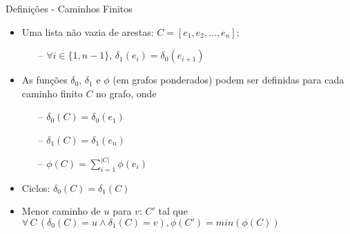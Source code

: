 \begin{frame}{Definições - Caminhos Finitos}
    \begin{itemize}
        \item Uma lista não vazia de arestas: $C = [e_1,e_2, ..., e_n]$;
        \begin{itemize}
            \item[--] $\forall i \in \{1, n-1\}$, $\delta_1(e_i) = \delta_0(e_{i+1})$
        \end{itemize}
        \item As funções $\delta_0$, $\delta_1$ e $\phi$ (em grafos ponderados) podem ser definidas para cada caminho finito $C$ no grafo, onde
        \begin{itemize}
            \item[--] $\delta_0(C) = \delta_0(e_1)$
            \item[--] $\delta_1(C) = \delta_1(e_n)$
            \item[--] $\phi(C) = \sum_{i=1}^{|C|} \phi(e_i)$
        \end{itemize}
        \item Ciclos: $\delta_0(C) = \delta_1(C)$
        \item Menor caminho de $u$ para $v$: $C'$ tal que $\forall\,C\,(\delta_0(C) = u \land \delta_1(C) = v), \phi(C') = min(\phi(C))$
    \end{itemize}
\end{frame}